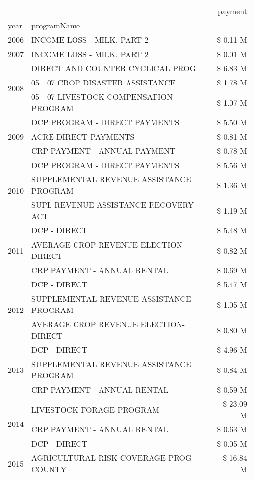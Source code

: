 \begin{tabular}{llr}
\toprule
 &  & payment \\
year & programName &  \\
\midrule
2006 & INCOME LOSS - MILK, PART 2 & \$ 0.11 M \\
\cline{1-3}
2007 & INCOME LOSS - MILK, PART 2 & \$ 0.01 M \\
\cline{1-3}
\multirow[t]{3}{*}{2008} & DIRECT AND COUNTER CYCLICAL PROG & \$ 6.83 M \\
 & 05 - 07 CROP DISASTER ASSISTANCE & \$ 1.78 M \\
 & 05 - 07 LIVESTOCK COMPENSATION PROGRAM & \$ 1.07 M \\
\cline{1-3}
\multirow[t]{3}{*}{2009} & DCP PROGRAM - DIRECT PAYMENTS & \$ 5.50 M \\
 & ACRE DIRECT PAYMENTS & \$ 0.81 M \\
 & CRP PAYMENT - ANNUAL PAYMENT & \$ 0.78 M \\
\cline{1-3}
\multirow[t]{3}{*}{2010} & DCP PROGRAM - DIRECT PAYMENTS & \$ 5.56 M \\
 & SUPPLEMENTAL REVENUE ASSISTANCE PROGRAM & \$ 1.36 M \\
 & SUPL REVENUE ASSISTANCE RECOVERY ACT & \$ 1.19 M \\
\cline{1-3}
\multirow[t]{3}{*}{2011} & DCP - DIRECT & \$ 5.48 M \\
 & AVERAGE CROP REVENUE ELECTION-DIRECT & \$ 0.82 M \\
 & CRP PAYMENT - ANNUAL RENTAL & \$ 0.69 M \\
\cline{1-3}
\multirow[t]{3}{*}{2012} & DCP - DIRECT & \$ 5.47 M \\
 & SUPPLEMENTAL REVENUE ASSISTANCE PROGRAM & \$ 1.05 M \\
 & AVERAGE CROP REVENUE ELECTION-DIRECT & \$ 0.80 M \\
\cline{1-3}
\multirow[t]{3}{*}{2013} & DCP - DIRECT & \$ 4.96 M \\
 & SUPPLEMENTAL REVENUE ASSISTANCE PROGRAM & \$ 0.84 M \\
 & CRP PAYMENT - ANNUAL RENTAL & \$ 0.59 M \\
\cline{1-3}
\multirow[t]{3}{*}{2014} & LIVESTOCK FORAGE PROGRAM & \$ 23.09 M \\
 & CRP PAYMENT - ANNUAL RENTAL & \$ 0.63 M \\
 & DCP - DIRECT & \$ 0.05 M \\
\cline{1-3}
\multirow[t]{3}{*}{2015} & AGRICULTURAL RISK COVERAGE PROG - COUNTY & \$ 16.84 M \\

\end{tabular}

